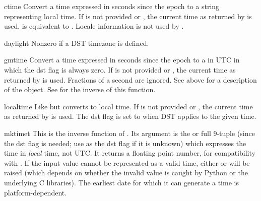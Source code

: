 \begin{funcdesc}{ctime}{}
Convert a time expressed in seconds since the epoch to a string
representing local time. If  is not provided or
, the current time as returned by  is
used.   is equivalent to
.
Locale information is not used by .
\end{funcdesc}

\begin{datadesc}{daylight}
Nonzero if a DST timezone is defined.
\end{datadesc}

\begin{funcdesc}{gmtime}{}
Convert a time expressed in seconds since the epoch to a 
in UTC in which the dst flag is always zero.  If  is not
provided or , the current time as returned by
 is used.  Fractions of a second are ignored.  See
above for a description of the  object. See
 for the inverse of this function.
\end{funcdesc}

\begin{funcdesc}{localtime}{}
Like  but converts to local time.  If  is
not provided or , the current time as returned by
 is used.  The dst flag is set to  when DST
applies to the given time.
\end{funcdesc}

\begin{funcdesc}{mktime}{t}
This is the inverse function of .  Its argument
is the  or full 9-tuple (since the dst flag is
needed; use  as the dst flag if it is unknown) which
expresses the time in
\emph{local} time, not UTC.  It returns a floating point number, for
compatibility with .  If the input value cannot be
represented as a valid time, either  or
 will be raised (which depends on whether the
invalid value is caught by Python or the underlying C libraries).  The
earliest date for which it can generate a time is platform-dependent.
\end{funcdesc}

